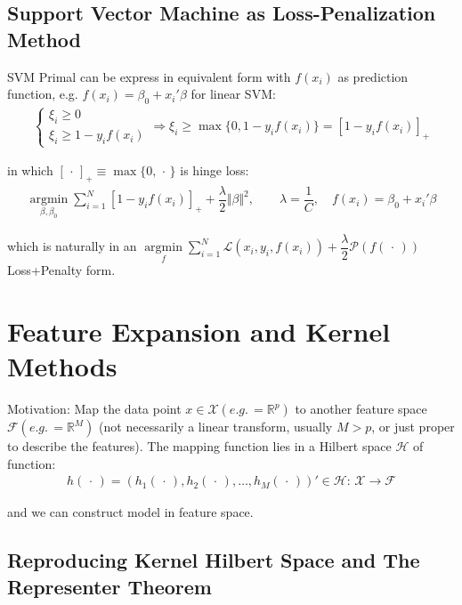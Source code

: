 \subsection{Support Vector Machine as Loss-Penalization Method}
    SVM Primal can be express in equivalent form with $ f(x_i) $ as prediction function, e.g. $ f(x_i)=\beta _0+x_i'\beta  $ for linear SVM:
    \begin{align}
        \begin{cases}
            \xi _i\geq 0\\
            \xi _i\geq 1-y_if(x_i)
        \end{cases} \Rightarrow \xi _i\geq \max\{0,1-y_if(x_i)\}= [1-y_if(x_i)]_+
    \end{align}
    
    in which $ [\,\cdot\,]_+\equiv \max\{0,\,\cdot\,\} $ is hinge loss:
    \begin{align}
        \mathop{\arg\min}\limits_{\beta ,\beta _0}\sum_{i=1}^N\left[1-y_if(x_i)\right]_++\dfrac{\lambda }{2}\Vert \beta  \Vert ^2,\qquad \lambda =\dfrac{1}{C} ,\quad f(x_i)=\beta _0+x_i'\beta 
    \end{align}
    
    which is naturally in an $ \mathop{\arg\min}\limits_{f}\sum_{i=1}^N\mathcal{L}\left(x_i,y_i,f(x_i)\right)+\dfrac{\lambda }{2}\mathcal{P}(f(\,\cdot\,))  $ Loss+Penalty form.  






\section{Feature Expansion and Kernel Methods}
    Motivation: Map the data point $ x\in \mathcal{X}(e.g.\,=\mathbb{R}^p) $ to another feature space $ \mathcal{F}(e.g.\,=\mathbb{R}^M) $ (not necessarily a linear transform, usually $ M>p $, or just proper to describe the features). The mapping function lies in a Hilbert space $ \mathcal{H} $ of function:
    \begin{align}
        h(\,\cdot\,)=\left(h_1(\,\cdot\,),h_2(\,\cdot\,),\ldots,h_M(\,\cdot\,)\right)'\in \mathcal{H}:\, \mathcal{X} \to \mathcal{F}
    \end{align}
    
    and we can construct model in feature space.    
    
\subsection{Reproducing Kernel Hilbert Space and The Representer Theorem}

